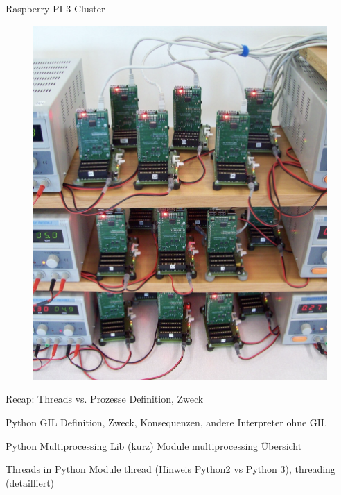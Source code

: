 \begin{frame}{Raspberry PI 3 Cluster}
	  \begin{figure}[!htb]
        \includegraphics[scale=0.23]{6-python3/img/raspi3cluster}  %
    \end{figure}

\end{frame}

\begin{frame}{Recap: Threads vs. Prozesse}
    Definition, Zweck
\end{frame}



\begin{frame}{Python GIL}
    Definition, Zweck, Konsequenzen, andere Interpreter ohne GIL
\end{frame}

\begin{frame}{Python Multiprocessing Lib (kurz)}
    Module multiprocessing Übersicht
\end{frame}

\begin{frame}{Threads in Python}
    Module thread (Hinweis Python2 vs Python 3), threading (detailliert)
\end{frame}

